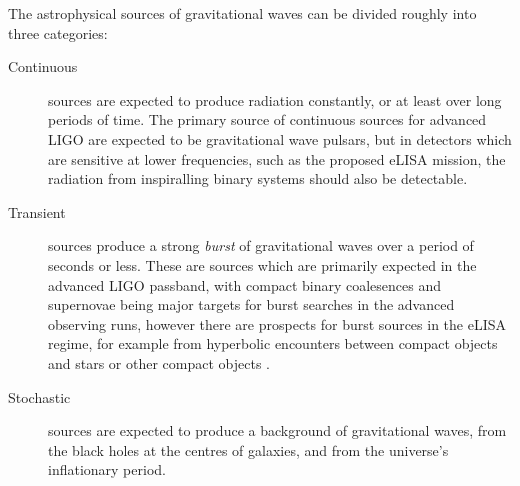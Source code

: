 The astrophysical sources of gravitational waves can be divided
roughly into three categories\cite{2009LRR....12....2S}:
\begin{description}
\item[Continuous] sources are expected to produce radiation
  constantly, or at least over long periods of time. The primary
  source of continuous sources for advanced LIGO are expected to be
  gravitational wave pulsars, but in detectors which are sensitive at
  lower frequencies, such as the proposed eLISA mission, the radiation
  from inspiralling binary systems should also be detectable.
\item[Transient] sources produce a strong \emph{burst} of
  gravitational waves over a period of seconds or less. These are
  sources which are primarily expected in the advanced LIGO passband,
  with compact binary coalesences and supernovae being major targets
  for burst searches in the advanced observing runs, however there are
  prospects for burst sources in the eLISA regime, for example from
  hyperbolic encounters between compact objects and stars or other
  compact objects
  \cite{2012PhRvD..86l4012B,2012PhRvD..86d4017D,2008MPLA...23...99C,2008APh....30..105C,2010MmSAI..81...87D,2005PhRvD..72h4009G,2010PhRvD..82j7501B,2011ApJ...729L..23G}.
\item[Stochastic] sources are expected to produce a background of
  gravitational waves, from the black holes at the centres of
  galaxies\cite{1980Natur.287..307B,2001astro.ph..8028P,2003ApJ...583..616J,2008MNRAS.390..192S},
  and from the universe's inflationary period\cite{1988PhRvD..37.2078A}.
\end{description}


